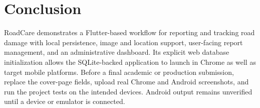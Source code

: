 \documentclass[12pt,a4paper]{report}
\begin{document}
\chapter{Conclusion}
RoadCare demonstrates a Flutter-based workflow for reporting and tracking road damage with local persistence, image and location support, user-facing report management, and an administrative dashboard. Its explicit web database initialization allows the SQLite-backed application to launch in Chrome as well as target mobile platforms. Before a final academic or production submission, replace the cover-page fields, upload real Chrome and Android screenshots, and run the project tests on the intended devices. Android output remains unverified until a device or emulator is connected.
\end{document}
